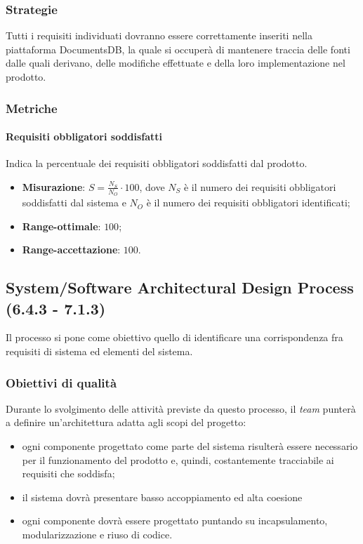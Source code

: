 \subsubsection{Strategie}
Tutti i requisiti individuati dovranno essere correttamente inseriti nella piattaforma DocumentsDB, la quale si occuperà di mantenere traccia delle fonti dalle quali derivano, delle modifiche effettuate e della loro implementazione nel prodotto.
\subsubsection{Metriche}
\paragraph{Requisiti obbligatori soddisfatti}
Indica la percentuale dei requisiti obbligatori soddisfatti dal prodotto.
\begin{itemize}
\item \textbf{Misurazione}: $S=\frac{N_{S}}{N_{O}} \cdot 100$, dove $N_{S}$ è il numero dei requisiti obbligatori soddisfatti dal sistema e $N_{O}$ è il numero dei requisiti obbligatori identificati;
\item \textbf{Range-ottimale}: $100$;
\item \textbf{Range-accettazione}: $100$.
\end{itemize}

\subsection{System/Software Architectural Design Process (6.4.3 - 7.1.3)}
Il processo si pone come obiettivo quello di identificare una corrispondenza fra requisiti di sistema ed elementi del sistema.
\subsubsection{Obiettivi di qualità}
Durante lo svolgimento delle attività previste da questo processo, il \textit{team} punterà a definire un'architettura adatta agli scopi del progetto:
\begin{itemize}
\item ogni componente progettato come parte del sistema risulterà essere necessario per il funzionamento del prodotto e, quindi, costantemente tracciabile ai requisiti che soddisfa;
\item il sistema dovrà presentare basso accoppiamento ed alta coesione
\item ogni componente dovrà essere progettato puntando su incapsulamento, modularizzazione e riuso di codice.
\end{itemize}

